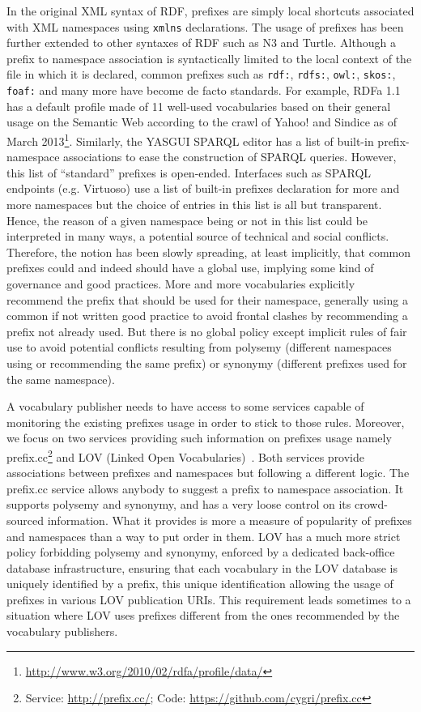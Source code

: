 \begin{description}
In the original XML syntax of RDF, prefixes are simply local shortcuts associated with XML namespaces using \texttt{xmlns} declarations. The usage of prefixes has been further extended to other syntaxes of RDF such as N3 and Turtle. Although a prefix to namespace association is syntactically limited to the local context of the file in which it is declared, common prefixes such as \texttt{rdf:}, \texttt{rdfs:}, \texttt{owl:}, \texttt{skos:}, \texttt{foaf:} and many more have become de facto standards. For example, RDFa 1.1 has a default profile made of 11 well-used vocabularies based on their general usage on the Semantic Web according to the crawl of Yahoo! and Sindice as of March 2013\footnote{\url{http://www.w3.org/2010/02/rdfa/profile/data/}}. Similarly, the YASGUI SPARQL editor has a list of built-in prefix-namespace associations to ease the construction of SPARQL queries. However, this list of ``standard'' prefixes is open-ended. Interfaces such as SPARQL endpoints (e.g. Virtuoso) use a list of built-in prefixes declaration for more and more namespaces but the choice of entries in this list is all but transparent. Hence, the reason of a given namespace being or not in this list could be interpreted in many ways, a potential source of technical and social conflicts. Therefore, the notion has been slowly spreading, at least implicitly, that common prefixes could and indeed should have a global use, implying some kind of governance and good practices. More and more vocabularies explicitly recommend the prefix that should be used for their namespace, generally using a common if not written good practice to avoid frontal clashes by recommending a prefix not already used. But there is no global policy except implicit rules of fair use to avoid potential conflicts resulting from polysemy (different namespaces using or recommending the same prefix) or synonymy (different prefixes used for the same namespace).

A vocabulary publisher needs to have access to some services capable of monitoring the existing prefixes usage in order to stick to those rules. Moreover, we focus on two services providing such information on prefixes usage namely prefix.cc\footnote{Service: \url{http://prefix.cc/}; Code: \url{https://github.com/cygri/prefix.cc}} and LOV (Linked Open Vocabularies)~\cite{Datalift:D22}. Both services provide associations between prefixes and namespaces but following a different logic. The prefix.cc service allows anybody to suggest a prefix to namespace association. It supports polysemy and synonymy, and has a very loose control on its crowd-sourced information. What it provides is more a measure of popularity of prefixes and namespaces than a way to put order in them. LOV has a much more strict policy forbidding polysemy and synonymy, enforced by a dedicated back-office database infrastructure, ensuring that each vocabulary in the LOV database is uniquely identified by a prefix, this unique identification allowing the usage of prefixes in various LOV publication URIs. This requirement leads sometimes to a situation where LOV uses prefixes different from the ones recommended by the vocabulary publishers.


\end{description}
